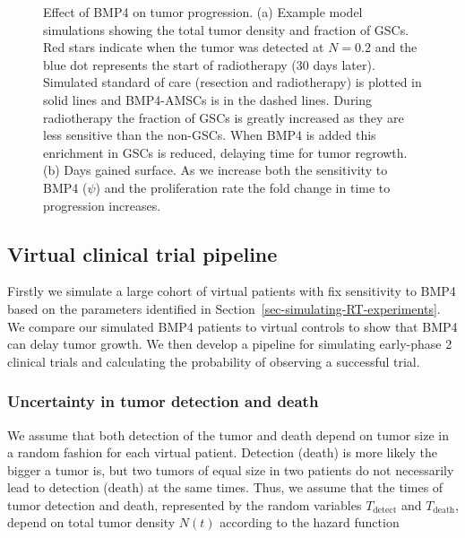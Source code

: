 \documentclass[
  letterpaper,
]{scrreprt}
\theoremstyle{definition}
\theoremstyle{remark}
\begin{document}
\begin{figure}
\begin{minipage}{0.50\linewidth}
{}

\subcaption{\label{fig-days_gained}}

\end{minipage}%

\caption{\label{fig-effect_BMP4}Effect of BMP4 on tumor progression. (a)
Example model simulations showing the total tumor density and fraction
of GSCs. Red stars indicate when the tumor was detected at \(N=0.2\) and
the blue dot represents the start of radiotherapy (30 days later).
Simulated standard of care (resection and radiotherapy) is plotted in
solid lines and BMP4-AMSCs is in the dashed lines. During radiotherapy
the fraction of GSCs is greatly increased as they are less sensitive
than the non-GSCs. When BMP4 is added this enrichment in GSCs is
reduced, delaying time for tumor regrowth. (b) Days gained surface. As
we increase both the sensitivity to BMP4 (\(\psi\)) and the
proliferation rate the fold change in time to progression increases.}

\end{figure}%

\subsection{Virtual clinical trial
pipeline}\label{sec-virtual-trial-pipeline}

Firstly we simulate a large cohort of virtual patients with fix
sensitivity to BMP4 based on the parameters identified in
Section~\ref{sec-simulating-RT-experiments}. We compare our simulated
BMP4 patients to virtual controls to show that BMP4 can delay tumor
growth. We then develop a pipeline for simulating early-phase 2 clinical
trials and calculating the probability of observing a successful trial.

\subsubsection{Uncertainty in tumor detection and
death}\label{sec-unce-death-detect}

We assume that both detection of the tumor and death depend on tumor
size in a random fashion for each virtual patient. Detection (death) is
more likely the bigger a tumor is, but two tumors of equal size in two
patients do not necessarily lead to detection (death) at the same times.
Thus, we assume that the times of tumor detection and death, represented
by the random variables \(T_{\text{detect}}\) and \(T_{\text{death}}\),
depend on total tumor density \(N(t)\) according to the hazard function
\end{document}
